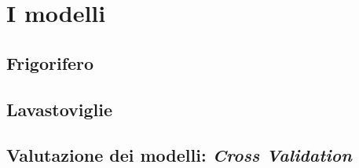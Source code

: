 \documentclass[12pt,a4paper,fleqn]{article}
\begin{document}
\section{I modelli}

\subsection{Frigorifero}

\subsection{Lavastoviglie}

\subsection{Valutazione dei modelli: \textsl{Cross Validation}}


\end{document}
